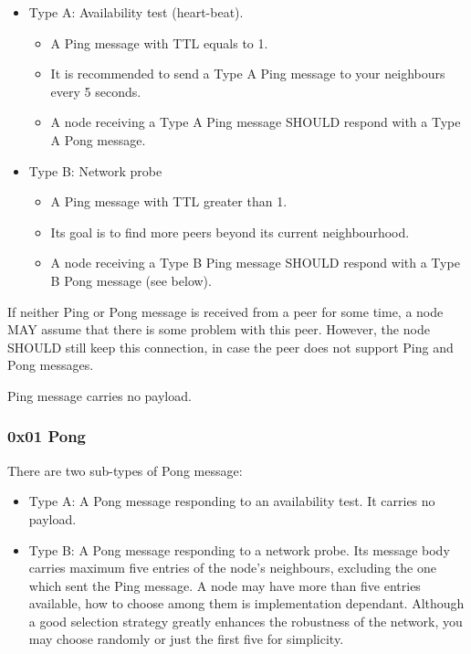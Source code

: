 \documentclass[12pt, a4paper]{article}
\begin{document}
\begin{itemize}
\item Type A: Availability test (heart-beat).
\begin{itemize}
\item A Ping message with TTL equals to 1.
\item It is recommended to send a Type A Ping message to your neighbours every 5 seconds.
\item A node receiving a Type A Ping message SHOULD respond with a Type A Pong message.
\end{itemize}
\item Type B: Network probe
\begin{itemize}
\item A Ping message with TTL greater than 1.
\item Its goal is to find more peers beyond its current neighbourhood.
\item A node receiving a Type B Ping message SHOULD respond with a Type B Pong message (see below). 
\end{itemize}
\end{itemize}

If neither Ping or Pong message is received from a peer for some time, a node MAY assume that there is some problem with this peer.
However, the node SHOULD still keep this connection, in case the peer does not support Ping and Pong messages.

Ping message carries no payload.

\subsubsection{0x01 Pong}
There are two sub-types of Pong message:

\begin{itemize}
\item Type A: A Pong message responding to an availability test.
It carries no payload.
\item Type B: A Pong message responding to a network probe.
Its message body carries maximum five entries of the node's neighbours, excluding the one which sent the Ping message.
A node may have more than five entries available, how to choose among them is implementation dependant.
Although a good selection strategy greatly enhances the robustness of the network, you may choose randomly or just the first five for simplicity.
\end{itemize}
\end{document}
